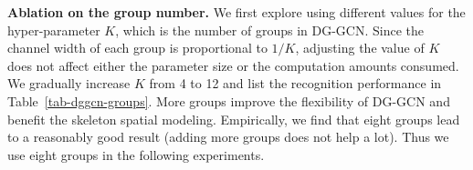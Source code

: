\begin{table*}[t]
	\centering
	\captionsetup{font=small}
	\captionsetup[subfloat]{font=small, position=bottom}
\caption{\small \textbf{Ablation study on different choices for DG-GCN design.}}
    \vspace{1mm}
	\label{tab-dggcn}
    \vspace{-13mm}
\end{table*}

\noindent
\textbf{Ablation on the group number. }
We first explore using different values for the hyper-parameter $K$, which is the number of groups in DG-GCN.
Since the channel width of each group is proportional to $1/K$, adjusting the value of $K$ does not affect either the parameter size or the computation amounts consumed.
We gradually increase $K$ from 4 to 12 and list the recognition performance in Table~\ref{tab-dggcn-groups}. 
More groups improve the flexibility of DG-GCN and benefit the skeleton spatial modeling. 
Empirically, we find that eight groups lead to a reasonably good result (adding more groups does not help a lot).
Thus we use eight groups in the following experiments. 

